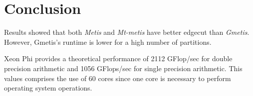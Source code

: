 \documentclass[abstract=on,9pt,twocolumn]{scrartcl}
\begin{document}

\section{Conclusion}
\label{sec:conc}
Results showed that both \textit{Metis} and \textit{Mt-metis} have
better edgecut than \textit{Gmetis}. However, Gmetis's runtime is lower
for a high number of partitions.


Xeon Phi provides a theoretical performance of 2112 GFlop/sec for double
precision arithmetic and 1056 GFlops/sec for single precision
arithmetic. This values comprises the use of 60 cores since one core is
necessary to perform operating system operations.






\end{document}
